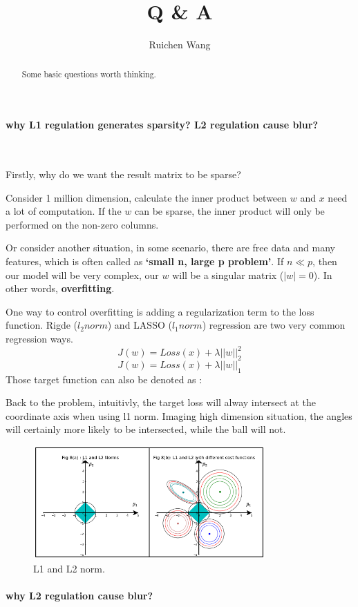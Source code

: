 \documentclass{article}
\author{Ruichen Wang}
\title{Q \& A}
\begin{document}
\maketitle
\begin{abstract}
Some basic questions worth thinking.
\end{abstract}
\noindent
\paragraph{why L1 regulation generates sparsity? L2 regulation cause blur?}~{}

Firstly, why do we want the result matrix to be sparse?

Consider 1 million dimension, calculate the inner product between $w$ and $x$ need a lot of computation. If the $w$ can be sparse, the inner product will only be performed on the non-zero columns.

Or consider another situation, in some scenario, there are free data and many features, which is often called as \textbf{`small n, large p problem'}. If $n \ll p $, then our model will be very complex, our $w$ will be a singular matrix ($|w|=0$). In other words, \textbf{overfitting}.

One way to control overfitting is adding a regularization term to the loss function. Rigde  ($l_{2} norm$) and LASSO ($l_{1} norm$) regression are two very common regression ways.
$$J(w)=Loss(x)+\lambda ||w||_{2}^{2}$$
$$J(w)=Loss(x)+\lambda ||w||_{1}$$
Those target function can also be denoted as :


Back to the problem, intuitivly, the target loss will alway intersect at the coordinate axis when using l1 norm. Imaging high dimension situation, the angles will certainly more likely to be intersected, while the ball will not.


\begin{figure}[H]
\centering
\includegraphics[width=3.5in,height=1.7in]{l1l2}
\caption{L1 and L2 norm.}
\end{figure}

\paragraph{why L2 regulation cause blur?}~{}
\end{document}
